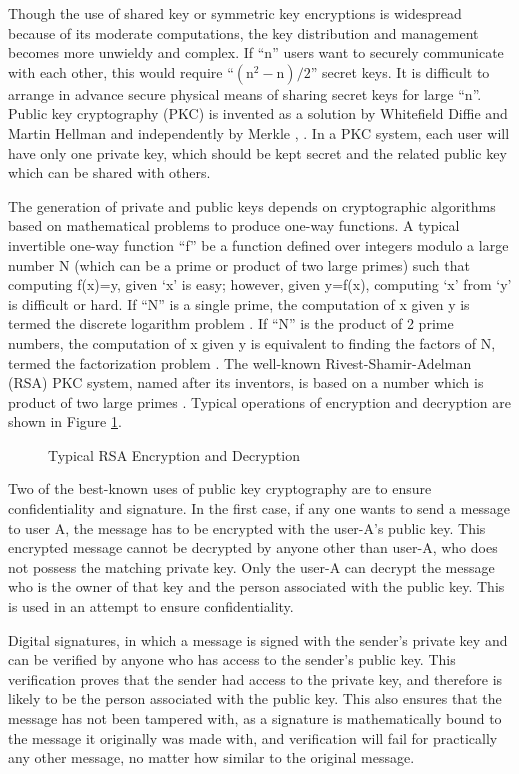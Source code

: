 \begin{multicols}{2}
Though the use of shared key or symmetric key encryptions is widespread because of its moderate computations, the key distribution and management becomes more unwieldy and complex. If ``n'' users want to securely communicate with each other, this would require ``$(\text{n}^{2}-\text{n})/2$'' secret keys. It is difficult to arrange in advance secure physical means of sharing secret keys for large ``n''. Public key cryptography (PKC) is invented as a solution by Whitefield Diffie and Martin Hellman and independently by Merkle \cite{key1}, \cite{key13}. In a PKC system, each user will have only one private key, which should be kept secret and the related public key which can be shared with others.

The generation of private and public keys depends on cryptographic algorithms based on mathematical problems to produce one-way functions. A typical invertible one-way function ``f'' be a function defined over integers modulo a large number N (which can be a prime or product of two large primes) such that computing f(x)=y, given `x' is easy; however, given y=f(x), computing `x' from `y' is difficult or hard. If ``N'' is a single prime, the computation of x given y is termed the discrete logarithm problem \cite{key1}. If ``N'' is the product of 2 prime numbers, the computation of x given y is equivalent to finding the factors of N, termed the factorization problem \cite{key1}. The well-known Rivest-Shamir-Adelman (RSA) PKC system, named after its inventors, is based on a number which is product of two large primes \cite{key14}. Typical operations of encryption and decryption are shown in Figure \ref{chap2-fig4}. 
\begin{figure}[!ht]
\centering
\caption{Typical RSA Encryption and Decryption}\label{chap2-fig4}
\end{figure}

Two of the best-known uses of public key cryptography are to ensure confidentiality and signature. In the first case, if any one wants to send a message to user A, the message has to be encrypted with the user-A's public key. This encrypted message cannot be decrypted by anyone other than user-A, who does not possess the matching private key. Only the user-A can decrypt the message who is the owner of that key and the person associated with the public key. This is used in an attempt to ensure confidentiality.

Digital signatures, in which a message is signed with the sender's private key and can be verified by anyone who has access to the sender's public key. This verification proves that the sender had access to the private key, and therefore is likely to be the person associated with the public key. This also ensures that the message has not been tampered with, as a signature is mathematically bound to the message it originally was made with, and verification will fail for practically any other message, no matter how similar to the original message.


\end{multicols}
